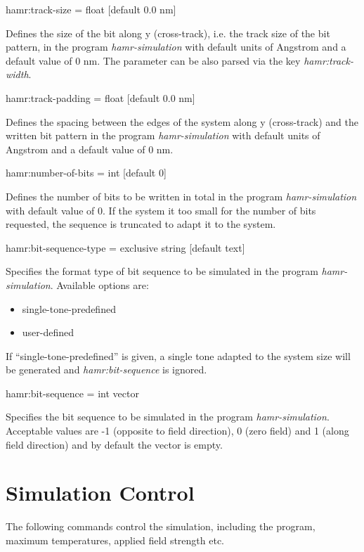 {\zicf hamr:track-size = float [default $0.0$ nm]}
Defines the size of the bit along y (cross-track), i.e. the track size of the bit pattern,
in the program \textit{hamr-simulation} with default units of Angstrom and a default value of 0 nm.
The parameter can be also parsed via the key \textit{hamr:track-width}.

{\zicf hamr:track-padding = float [default $0.0$ nm]}
Defines the spacing between the edges of the system along y (cross-track) and the written bit pattern
in the program \textit{hamr-simulation} with default units of Angstrom and a default value of 0 nm.

{\zicf hamr:number-of-bits = int [default $0$]}
Defines the number of bits to be written in total in the program \textit{hamr-simulation} with default value of 0.
If the system it too small for the number of bits requested, the sequence is truncated to adapt it to the system.

{\zicf hamr:bit-sequence-type =  exclusive string [default text]}
Specifies the format type of bit sequence to be simulated in the program \textit{hamr-simulation}. Available options are:
\begin{itemize}
	\item[] single-tone-predefined
	\item[] user-defined
\end{itemize}
If ``single-tone-predefined'' is given, a single tone adapted to the system size will be generated and \textit{ hamr:bit-sequence} is ignored.

{\zicf hamr:bit-sequence = int vector}
Specifies the bit sequence to be simulated in the program \textit{hamr-simulation}.
Acceptable values are -1 (opposite to field direction), 0 (zero field) and 1 (along field direction) and by default the vector is empty.

\section*{Simulation Control}
The following commands control the simulation, including the program, maximum temperatures, applied field strength etc.

